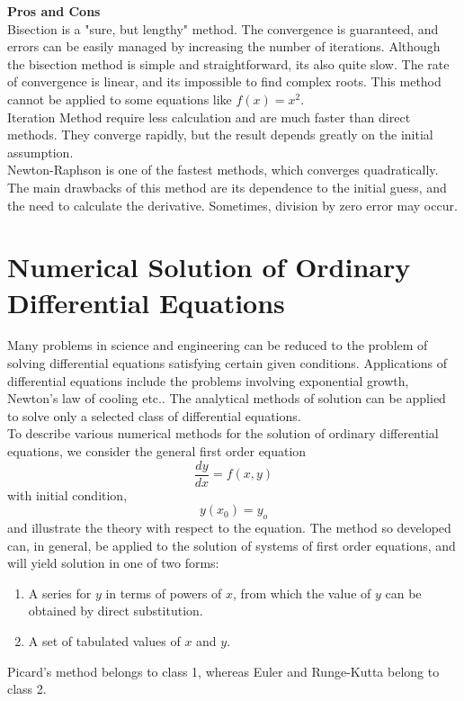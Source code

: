 \documentclass[12pt,a4paper,oneside]{book}
\begin{document}
\noindent
\textbf{\large Pros and Cons}\\
Bisection is a "sure, but lengthy" method. The convergence is guaranteed, and errors can be easily managed by increasing the number of iterations. Although the bisection method is simple and straightforward, its also quite slow. The rate of convergence is linear, and its impossible to find complex roots. This method cannot be applied to some equations like $f(x)=x^2$.\\
Iteration Method require less calculation and are much faster than direct methods. They converge rapidly, but the result depends greatly on the initial assumption. \\
Newton-Raphson is one of the fastest methods, which converges quadratically. The main drawbacks of this method are its dependence to the initial guess, and the need to calculate the derivative. Sometimes, division by zero error may occur. 









\newpage
\chapter{Numerical Solution of Ordinary Differential Equations}
Many problems in science and engineering can be reduced to the problem of solving differential equations satisfying certain given conditions. Applications of differential equations include the problems involving exponential growth, Newton's law of cooling etc.. The analytical methods of solution can be applied to solve only a selected class of differential equations.\\
To describe various numerical methods for the solution of ordinary differential equations, we consider the general first order equation
\begin{equation}\label{eq2.1}\dfrac{dy}{dx}=f(x,y)\end{equation}
with initial condition,
$$y(x_0)=y_o$$
and illustrate the theory with respect to the equation. The method so developed can, in general, be applied to the solution of systems of first order equations, and will yield solution in one of two forms:
\begin{enumerate}
	\item A series for $y$ in terms of powers of $x$, from which the value of $y$ can be obtained by direct substitution.
	\item A set of tabulated values of $x$ and $y$.
\end{enumerate}
Picard's method belongs to class 1, whereas Euler and Runge-Kutta belong to class 2.
\end{document}
